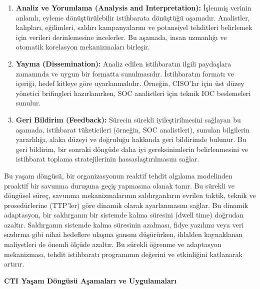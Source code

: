 \begin{enumerate}
    \item \textbf{Analiz ve Yorumlama (Analysis and Interpretation):} İşlenmiş verinin anlamlı, eyleme dönüştürülebilir istihbarata dönüştüğü aşamadır. Analistler, kalıpları, eğilimleri, saldırı kampanyalarını ve potansiyel tehditleri belirlemek için verileri derinlemesine incelerler. Bu aşamada, insan uzmanlığı ve otomatik korelasyon mekanizmaları birleşir.
    \item \textbf{Yayma (Dissemination):} Analiz edilen istihbaratın ilgili paydaşlara zamanında ve uygun bir formatta sunulmasıdır. İstihbaratın formatı ve içeriği, hedef kitleye göre uyarlanmalıdır. Örneğin, CISO'lar için üst düzey yönetici brifingleri hazırlanırken, SOC analistleri için teknik IOC beslemeleri sunulur.
    \item \textbf{Geri Bildirim (Feedback):} Sürecin sürekli iyileştirilmesini sağlayan bu aşamada, istihbarat tüketicileri (örneğin, SOC analistleri), sunulan bilgilerin yararlılığı, alaka düzeyi ve doğruluğu hakkında geri bildirimde bulunur. Bu geri bildirim, bir sonraki döngüde daha iyi gereksinimlerin belirlenmesini ve istihbarat toplama stratejilerinin hassaslaştırılmasını sağlar.
\end{enumerate}

Bu yaşam döngüsü, bir organizasyonun reaktif tehdit algılama modelinden proaktif bir savunma duruşuna geçiş yapmasına olanak tanır. Bu sürekli ve döngüsel süreç, savunma mekanizmalarının saldırganların evrilen taktik, teknik ve prosedürlerine (TTP'ler) göre dinamik olarak ayarlanmasını sağlar. Bu dinamik adaptasyon, bir saldırganın bir sistemde kalma süresini (dwell time) doğrudan azaltır. Saldırganın sistemde kalma süresinin azalması, fidye yazılımı veya veri sızdırma gibi nihai hedeflere ulaşma şansını düşürürken, ihlalden kaynaklanan maliyetleri de önemli ölçüde azaltır. Bu sürekli öğrenme ve adaptasyon mekanizması, tehdit istihbaratı programının değerini ve etkinliğini katlanarak artırır.

\textbf{CTI Yaşam Döngüsü Aşamaları ve Uygulamaları}

